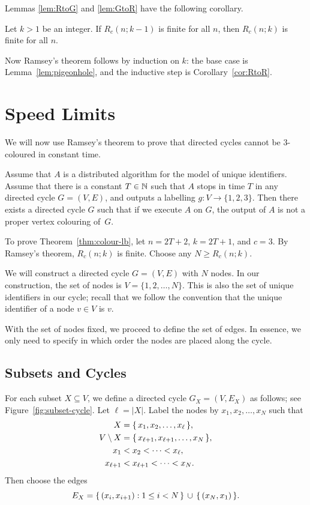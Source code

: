 Lemmas \ref{lem:RtoG} and \ref{lem:GtoR} have the following corollary.

\begin{corollary}\label{cor:RtoR}
    Let $k > 1$ be an integer.
    If $R_c(n;k-1)$ is finite for all $n$, then $R_c(n;k)$ is finite for all $n$.
\end{corollary}

Now Ramsey's theorem follows by induction on $k$: the base case is Lemma~\ref{lem:pigeonhole}, and the inductive step is Corollary~\ref{cor:RtoR}.


\section{Speed Limits}\label{sec:speed-limits}

We will now use Ramsey's theorem to prove that directed cycles cannot be $3$-coloured in constant time.

\begin{theorem}\label{thm:colour-lb}
    Assume that $A$ is a distributed algorithm for the model of unique identifiers. Assume that there is a constant $T \in \mathbb{N}$ such that $A$ stops in time $T$ in any directed cycle $G = (V,E)$, and outputs a labelling $g\colon V \to \{1,2,3\}$. Then there exists a directed cycle $G$ such that if we execute $A$ on $G$, the output of $A$ is not a proper vertex colouring of~$G$.
\end{theorem}

To prove Theorem~\ref{thm:colour-lb}, let $n = 2T+2$, $k = 2T+1$, and $c = 3$. By Ramsey's theorem, $R_c(n;k)$ is finite. Choose any $N \ge R_c(n;k)$.

We will construct a directed cycle $G = (V,E)$ with $N$ nodes. In our construction, the set of nodes is $V = \{1,2,\dotsc,N\}$. This is also the set of unique identifiers in our cycle; recall that we follow the convention that the unique identifier of a node $v \in V$ is $v$.

With the set of nodes fixed, we proceed to define the set of edges. In essence, we only need to specify in which order the nodes are placed along the cycle.

\subsection{Subsets and Cycles}

For each subset $X \subseteq V$, we define a directed cycle $G_X = (V,E_X)$ as follows; see Figure~\ref{fig:subset-cycle}. Let $\ell = |X|$. Label the nodes by $x_1, x_2, \dotsc, x_N$ such that
\begin{align*}
    X &= \{\,  x_1, x_2, \dotsc, x_{\ell}  \,\}, \\
    V \setminus X &= \{\,  x_{\ell+1}, x_{\ell+1}, \dotsc, x_N  \,\}, \\
    x_1 &< x_2 < \dotsb < x_{\ell}, \\
    x_{\ell+1} &< x_{\ell+1} < \dotsb < x_N.
\end{align*}
Then choose the edges
\[
    E_X = \{\,  (x_i, x_{i+1}) : 1 \le i < N  \,\} \, \cup \, \{\,  (x_N,x_1)  \,\}.
\]

